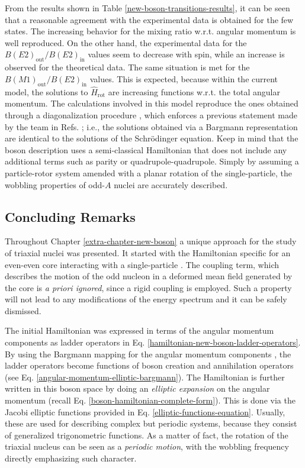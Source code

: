 From the results shown in Table \ref{new-boson-transitions-results}, it can be seen that a reasonable agreement with the experimental data is obtained for the few states. The increasing behavior for the mixing ratio w.r.t. angular momentum is well reproduced. On the other hand, the experimental data for the $B(E2)_\text{out}/B(E2)_\text{in}$ values seem to decrease with spin, while an increase is observed for the theoretical data. The same situation is met for the $B(M1)_\text{out}/B(E2)_\text{in}$ values. This is expected, because within the current model, the solutions to $\hat{H}_\text{rot}$ are increasing functions w.r.t. the total angular momentum. The calculations involved in this model reproduce the ones obtained through a diagonalization procedure \cite{tanabe2017stability}, which enforces a previous statement made by the team in Refs. \cite{raduta2017semiclassical,raduta2018wobbling}; i.e., the solutions obtained via a Bargmann representation are identical to the solutions of the Schrödinger equation. Keep in mind that the boson description uses a semi-classical Hamiltonian that does not include any additional terms such as parity or quadrupole-quadrupole. Simply by assuming a particle-rotor system amended with a planar rotation of the single-particle, the wobbling properties of odd-$A$ nuclei are accurately described.

\subsection{Concluding Remarks}
\label{new-boson-concluding-remarks}

Throughout Chapter \ref{extra-chapter-new-boson} a unique approach for the study of triaxial nuclei was presented. It started with the Hamiltonian specific for an even-even core interacting with a single-particle \cite{raduta2017semiclassical,raduta2018wobbling,raduta2020approach}. The coupling term, which describes the motion of the odd nucleon in a deformed mean field generated by the core is \emph{a priori ignored}, since a rigid coupling is employed. Such a property will not lead to any modifications of the energy spectrum and it can be safely dismissed. 

The initial Hamiltonian was expressed in terms of the angular momentum components as ladder operators in Eq. \ref{hamiltonian-new-boson-ladder-operators}. By using the Bargmann mapping for the angular momentum components \cite{bargmann1962representations}, the ladder operators become functions of boson creation and annihilation operators (see Eq. \ref{angular-momentum-elliptic-bargmann}). The Hamiltonian is further written in this boson space by doing an \emph{elliptic expansion} on the angular momentum (recall Eq. \ref{boson-hamiltonian-complete-form}). This is done via the Jacobi elliptic functions provided in Eq. \ref{elliptic-functions-equation}. Usually, these are used for describing complex but periodic systems, because they consist of generalized trigonometric functions. As a matter of fact, the rotation of the triaxial nucleus can be seen as a \emph{periodic motion}, with the wobbling frequency directly emphasizing such character.

